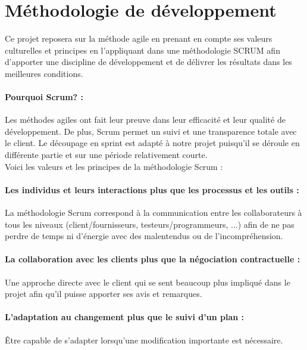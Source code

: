 \documentclass[a4paper,11pt,french]{article}
\begin{document}
\newpage

\section{Méthodologie de développement}

Ce projet reposera sur la méthode agile en prenant en compte ses valeurs culturelles et principes en l'appliquant dans une méthodologie SCRUM afin d'apporter une discipline de développement et de délivrer les résultats dans les meilleures conditions.

\paragraph{Pourquoi Scrum? :} Les méthodes agiles ont fait leur preuve dans leur efficacité et leur qualité de développement. De plus, Scrum permet un suivi et une transparence totale avec le client. Le découpage en sprint est adapté à notre projet puisqu'il se déroule en différente partie et sur une période relativement courte. \\

Voici les valeurs et les principes de la méthodologie Scrum : 
\paragraph{Les individus et leurs interactions plus que les processus et les outils :} 
La méthodologie Scrum correspond à la communication entre les collaborateurs à tous les niveaux (client/fournisseurs, testeurs/programmeurs, ...) afin de ne pas perdre de temps ni d'énergie avec des malentendus ou de l'incompréhension.

\paragraph{La collaboration avec les clients plus que la négociation contractuelle :}
Une approche directe avec le client qui se sent beaucoup plus impliqué dans le projet afin qu'il puisse apporter ses avis et remarques.

\paragraph{L’adaptation au changement plus que le suivi d’un plan :}
Être capable de s'adapter lorsqu'une modification importante est nécessaire.
\\
\end{document}
